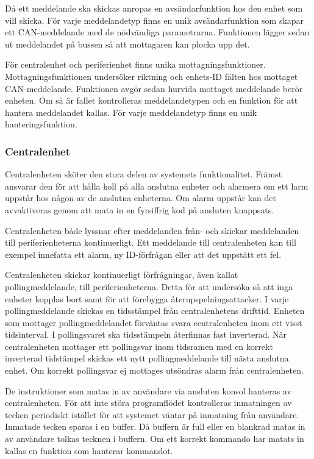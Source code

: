 \documentclass[a4paper]{article}
\begin{document}
Då ett meddelande ska skickas anropas en avsändarfunktion hos den enhet som vill skicka.
För varje meddelandetyp finns en unik avsändarfunktion som skapar ett CAN-meddelande med de nödvändiga parametrarna.
Funktionen lägger sedan ut meddelandet på bussen så att mottagaren kan plocka upp det.

För centralenhet och periferienhet finns unika mottagningsfunktioner.
Mottagningsfunktionen undersöker riktning och enhets-ID fälten hos mottaget CAN-meddelande.
Funktionen avgör sedan hurvida mottaget meddelande berör enheten.
Om så är fallet kontrolleras meddelandetypen och en funktion för att hantera meddelandet kallas.
För varje meddelandetyp finns en unik hanteringsfunktion.

\subsubsection{Centralenhet}
Centralenheten sköter den stora delen av systemets funktionalitet.
Främst ansvarar den för att hålla koll på alla anslutna enheter och alarmera om ett larm uppstår hos någon av de anslutna enheterna.
Om alarm uppstår kan det avvaktiveras genom att mata in en fyrsiffrig kod på ansluten knappsats.

Centralenheten både lyssnar efter meddelanden från- och skickar meddelanden till periferienheterna kontinuerligt.
Ett meddelande till centralenheten kan till exempel innefatta ett alarm, ny ID-förfrågan eller att det uppstått ett fel.


Centralenheten skickar kontinuerligt förfrågningar, även kallat pollingmeddelande, till periferienheterna.
Detta för att undersöka så att inga enheter kopplas bort samt för att förebygga återupspelningsattacker.
I varje pollingmeddelande skickas en tidsstämpel från centralenhetens drifttid.
Enheten som mottager pollingmeddelandet förväntas svara centralenheten inom ett visst tidsinterval.
I pollingsvaret ska tidsstämpeln återfinnas fast inverterad.
När centralenheten mottager ett pollingsvar inom tidsramen med en korrekt inverterad tidstämpel skickas ett nytt pollingmeddelande till nästa anslutna enhet.
Om korrekt pollingsvar ej mottages utsöndras alarm från centralenheten.

De instruktioner som matas in av användare via ansluten konsol hanteras av centralenheten.
För att inte störa programflödet kontrolleras inmatningen av tecken periodiskt istället för att systemet väntar på inmatning från användare.
Inmatade tecken sparas i en buffer.
Då buffern är full eller en blankrad matas in av användare tolkas tecknen i buffern.
Om ett korrekt kommando har matats in kallas en funktion som hanterar kommandot.
\end{document}
